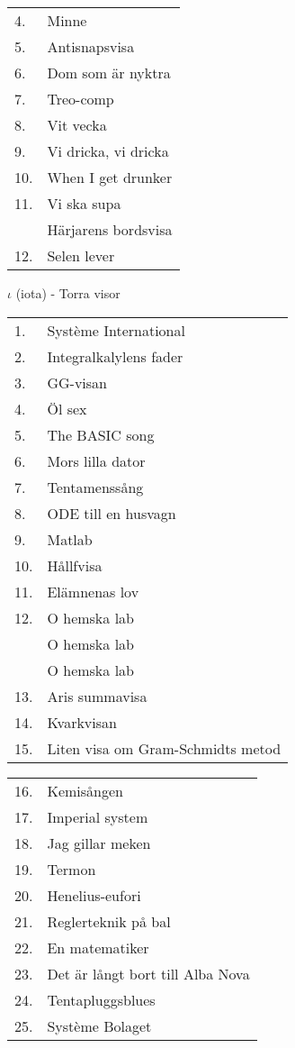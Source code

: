\documentclass[a6paper,10pt]{article}
\begin{document}
\begin{table}[!h]
\begin{tabularx}{1\textwidth}{l X}
4.&Minne\\
5.&Antisnapsvisa\\
6.&Dom som är nyktra\\
7.&Treo-comp\\
8.&Vit vecka\\
9.&Vi dricka, vi dricka\\
10.&When I get drunker\\
11.&Vi ska supa\\
&Härjarens bordsvisa\\
12.&Selen lever
\end{tabularx}
\end{table}
\vspace{5pt}
\noindent
\Large $\iota$ (iota) - Torra visor
\vspace{-5pt}
\begin{table}[!h]
\begin{tabularx}{1\textwidth}{l X}
1.&Système International\\
2.&Integralkalylens fader\\
3.&GG-visan\\
4.&Öl sex\\
5.&The BASIC song\\
6.&Mors lilla dator\\
7.&Tentamenssång\\
8.&ODE till en husvagn\\
9.&Matlab\\
10.&Hållfvisa\\
11.&Elämnenas lov\\
12.&O hemska lab\\
&O hemska lab\\
&O hemska lab\\
13.&Aris summavisa\\
14.&Kvarkvisan\\
15.&Liten visa om Gram-Schmidts metod\\
\end{tabularx}
\end{table}
\begin{table}[!h]
\begin{tabularx}{1\textwidth}{l X}
16.&Kemisången\\
17.&Imperial system\\
18.&Jag gillar meken\\
19.&Termon\\
20.&Henelius-eufori\\
21.&Reglerteknik på bal\\
22.&En matematiker\\
23.&Det är långt bort till Alba Nova\\
24.&Tentapluggsblues\\
25.&Système Bolaget
\end{tabularx}
\end{table}
\end{document}
